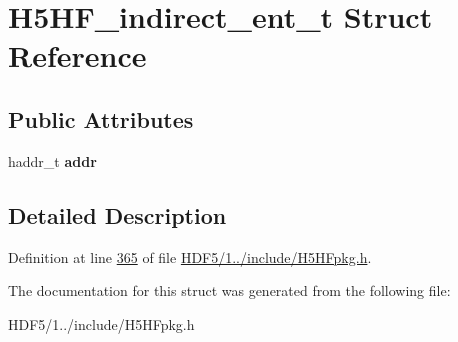 \hypertarget{struct_h5_h_f__indirect__ent__t}{}\section{H5\+H\+F\+\_\+indirect\+\_\+ent\+\_\+t Struct Reference}
\label{struct_h5_h_f__indirect__ent__t}
\subsection*{Public Attributes}
\begin{DoxyCompactItemize}
\item 
\mbox{\label{struct_h5_h_f__indirect__ent__t_a00969c8f783a7d47b59c9ae5e319fdab}} 
haddr\+\_\+t {\bfseries addr}
\end{DoxyCompactItemize}


\subsection{Detailed Description}


Definition at line \hyperlink{_h_d_f5_21_810_81_2include_2_h5_h_fpkg_8h_source_l00365}{365} of file \hyperlink{_h_d_f5_21_810_81_2include_2_h5_h_fpkg_8h_source}{H\+D\+F5/1../include/\+H5\+H\+Fpkg.\+h}.



The documentation for this struct was generated from the following file\+:\begin{DoxyCompactItemize}
\item 
H\+D\+F5/1../include/\+H5\+H\+Fpkg.\+h\end{DoxyCompactItemize}

